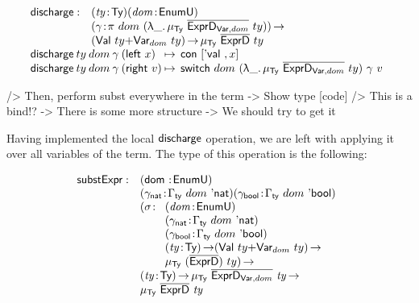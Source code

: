 \[\stk{
\begin{array}{@{}ll}
\discharge : & \PITEL{\V{ty}}{\Ty}
               \PITEL{\V{dom}}{\EnumU} \\
             & \PI{\V{\gamma}}{\spi{dom}{(\LAM{\_} \IMu{\Ty}{\toIDesc{\HExprVarD{dom}}}{ty})}} \\
             & (\SUM{\Val{ty}}{\Var{dom}{ty}}) \To
               \IMu{\Ty}{\toIDesc{\HExprD}}{ty} 
\end{array} \\
\begin{array}{@{}l@{\:\mapsto\:\:}l}
\discharge\: ty\: dom\: \gamma\: (\SumLeft x)  & \Con{\pair{\Eval{}}{x}{}} \\
\discharge\: ty\: dom\: \gamma\: (\SumRight v) & \switch{dom}{(\LAM{\_} \IMu{\Ty}{\toIDesc{\HExprVarD{dom}}}{ty})}{\gamma}{v}
\end{array}
}\]

\begin{wstructure}
            /> Then, perform subst everywhere in the term
                -> Show type [code]
                /> This is a bind!?
                -> There is some more structure 
                    -> We should try to get it
\end{wstructure}

Having implemented the local $\discharge$ operation, we are left with
applying it over all variables of the term. The type of this operation
is the following:

\newcommand{\substH}{\F{substExpr}}
\newcommand{\domNat}{dom_{\CN{nat}}}
\newcommand{\domBool}{dom_{\CN{bool}}}
\newcommand{\gammaNat}{\gamma_{\CN{nat}}}
\newcommand{\gammaBool}{\gamma_{\CN{bool}}}
\newcommand{\GammaSpi}[2]{\Gamma_{\CN{ty}}~#1~#2}

\[
\begin{array}{@{}ll}
\substH  : & \PITEL{\V{\dom}}{\EnumU} \\
           & \PITEL{\V{\gammaNat}}{\GammaSpi{dom}{\Enat}} 
             \PITEL{\V{\gammaBool}}{\GammaSpi{dom}{\Ebool}} \\
           & \begin{array}{@{}ll}
             \PI{\V{\sigma}}{& \PITEL{\V{dom}}{\EnumU} \\
                             & \PITEL{\V{\gammaNat}}
                                     {\GammaSpi{dom}{\Enat}} \\
                             & \PITEL{\V{\gammaBool}}
                                     {\GammaSpi{dom}{\Ebool}} \\
                             & \PI{\V{ty}}{\Ty} (\SUM{\Val{ty}}{\Var{dom}{ty}}) \To \\
                             & \IMu{\Ty}{(\toIDesc{\HExprD})}{ty}}
             \end{array}\\
          & \PI{\V{ty}}{\Ty}
            \IMu{\Ty}{\toIDesc{\HExprVarD{dom}}}{\V{ty}} \To \\
          & \IMu{\Ty}{\toIDesc{\HExprD}}{\V{ty}}
\end{array}
\]

